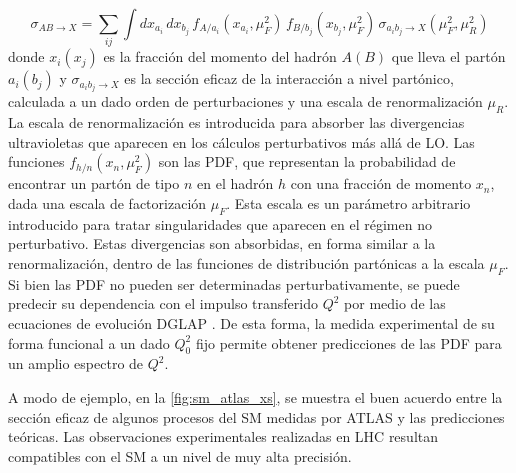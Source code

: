 \begin{equation}
  \sigma_{AB\to X} = \sum_{ij} \int dx_{a_i} \, dx_{b_j} \, f_{A/a_i} (x_{a_i}, \mu_F^2) \, f_{B/b_j} (x_{b_j}, \mu_F^2) \, \sigma_{a_i b_j\to X}(\mu_F^2,\mu_R^2)
\end{equation}
%
donde $x_i(x_j)$ es la fracción del momento del hadrón $A(B)$ que lleva el
partón $a_i(b_j)$ y $\sigma_{a_i b_j\to X}$ es la sección eficaz de la
interacción a nivel partónico, calculada a un dado orden de perturbaciones y una
escala de renormalización $\mu_R$. La escala de renormalización es introducida
para absorber las divergencias ultravioletas que aparecen en los cálculos
perturbativos más allá de LO. Las funciones $f_{h/n}(x_n,\mu_F^2)$ son las PDF,
que representan la probabilidad de encontrar un partón de tipo $n$ en el hadrón
$h$ con una fracción de momento $x_n$, dada una escala de factorización $\mu_F$.
Esta escala es un parámetro arbitrario introducido para tratar singularidades
que aparecen en el régimen no perturbativo. Estas divergencias son absorbidas,
en forma similar a la renormalización, dentro de las funciones de distribución
partónicas a la escala $\mu_F$. Si bien las PDF no pueden ser determinadas
perturbativamente, se puede predecir su dependencia con el impulso transferido $Q^2$
por medio de las
ecuaciones de evolución DGLAP \cite{Gribov:1972ri,Lipatov:1974qm,ALTARELLI1977298}.
De esta forma, la medida experimental de su
forma funcional a un dado $Q_0^2$ fijo permite obtener predicciones de las PDF
para un amplio espectro de $Q^2$.

A modo de ejemplo, en la \cref{fig:sm_atlas_xs}, se muestra el buen acuerdo
entre la sección eficaz de algunos procesos del SM medidas por ATLAS y las
predicciones teóricas. Las observaciones experimentales realizadas en LHC
resultan compatibles con el SM a un nivel de muy alta precisión.

